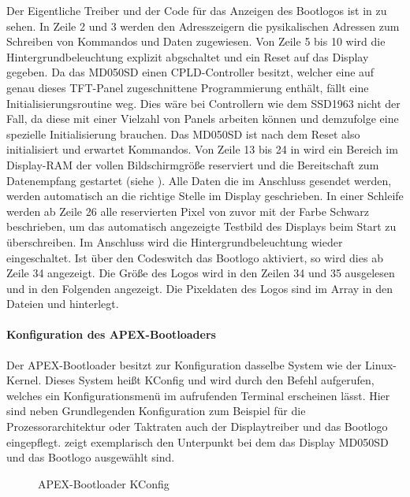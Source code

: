 Der Eigentliche Treiber und der Code für das Anzeigen des Bootlogos ist in  zu sehen. In Zeile 2 und 3 werden den Adresszeigern die pysikalischen Adressen zum Schreiben von Kommandos und Daten zugewiesen. Von Zeile 5 bis 10 wird die Hintergrundbeleuchtung explizit abgschaltet und ein Reset auf das Display gegeben. Da das MD050SD einen CPLD-Controller besitzt, welcher eine auf genau dieses TFT-Panel zugeschnittene Programmierung enthält, fällt eine Initialisierungsroutine weg. Dies wäre bei Controllern wie dem SSD1963 nicht der Fall, da diese mit einer Vielzahl von Panels arbeiten können und demzufolge eine spezielle Initialisierung brauchen. Das MD050SD ist nach dem Reset also initialisiert und erwartet Kommandos. Von Zeile 13 bis 24 in  wird ein Bereich im Display-RAM der vollen Bildschirmgröße reserviert und die Bereitschaft zum Datenempfang gestartet (siehe ). Alle Daten die im Anschluss gesendet werden, werden automatisch an die richtige Stelle im Display geschrieben. In einer Schleife werden ab Zeile 26 alle reservierten Pixel von zuvor mit der Farbe Schwarz beschrieben, um das automatisch angezeigte Testbild des Displays beim Start zu überschreiben. Im Anschluss wird die Hintergrundbeleuchtung wieder eingeschaltet. Ist über den Codeswitch  das Bootlogo aktiviert, so wird dies ab Zeile 34 angezeigt. Die Größe des Logos wird in den Zeilen 34 und 35 ausgelesen und in den Folgenden angezeigt. Die Pixeldaten des Logos sind im Array  in den Dateien  und  hinterlegt.


\paragraph{Konfiguration des APEX-Bootloaders}
\label{cha:config_apex}
Der APEX-Bootloader besitzt zur Konfiguration dasselbe System wie der Linux-Kernel. Dieses System heißt KConfig und wird durch den Befehl  aufgerufen, welches ein Konfigurationsmenü im aufrufenden Terminal erscheinen lässt. Hier sind neben Grundlegenden Konfiguration zum Beispiel für die Prozessorarchitektur oder Taktraten auch der Displaytreiber und das Bootlogo eingepflegt.  zeigt exemplarisch den Unterpunkt  bei dem das Display MD050SD und das Bootlogo ausgewählt sind. 

\begin{figure}[tbph]
	\centering
{}
	\caption{APEX-Bootloader KConfig}
	\label{fig:apex_config}
\end{figure}
\newpage

